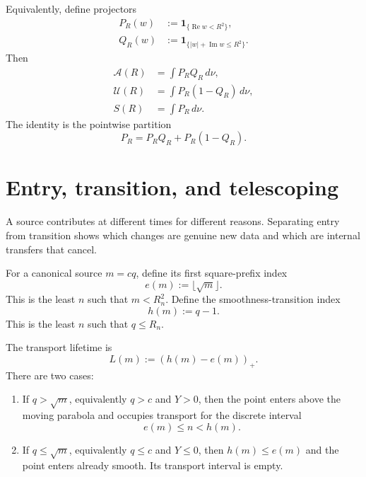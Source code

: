 \documentclass[11pt]{article}
\theoremstyle{definition}
\newcommand{\1}{\mathbf{1}}
\newcommand{\Repart}{\operatorname{Re}}
\newcommand{\Impart}{\operatorname{Im}}
\begin{document}
Equivalently, define projectors
\begin{align}
 P_R(w)&:=\1_{\{\Repart w<R^2\}},
 \label{eq:P-projector}\\
 Q_R(w)&:=\1_{\{|w|+\Impart w\le R^2\}}.
 \label{eq:Q-projector}
\end{align}
Then
\begin{align}
 \mathcal A(R)&=\int P_RQ_R\,d\nu,
 \label{eq:A-projector}\\
 \mathcal U(R)&=\int P_R(1-Q_R)\,d\nu,
 \label{eq:U-projector}\\
 S(R)&=\int P_R\,d\nu.
 \label{eq:S-projector}
\end{align}
The identity is the pointwise partition
\begin{equation}
 P_R=P_RQ_R+P_R(1-Q_R).
 \label{eq:projector-partition}
\end{equation}


\section{Entry, transition, and telescoping}
\label{sec:telescoping}

A source contributes at different times for different reasons.  Separating entry from transition shows which changes are genuine new data and which are internal transfers that cancel.

For a canonical source $m=cq$, define its first square-prefix index
\begin{equation}
 e(m):=\lfloor\sqrt m\rfloor.
 \label{eq:entry-index}
\end{equation}
This is the least $n$ such that $m<R_n^2$.  Define the smoothness-transition index
\begin{equation}
 h(m):=q-1.
 \label{eq:transition-index}
\end{equation}
This is the least $n$ such that $q\le R_n$.

The transport lifetime is
\begin{equation}
 L(m):=(h(m)-e(m))_+.
 \label{eq:lifetime}
\end{equation}
There are two cases:

\begin{enumerate}[leftmargin=1.7em,itemsep=0.3em]
\item If $q>\sqrt m$, equivalently $q>c$ and $Y>0$, then the point enters above the moving parabola and occupies transport for the discrete interval
\[
 e(m)\le n<h(m).
\]
\item If $q\le\sqrt m$, equivalently $q\le c$ and $Y\le0$, then $h(m)\le e(m)$ and the point enters already smooth.  Its transport interval is empty.
\end{enumerate}
\end{document}
